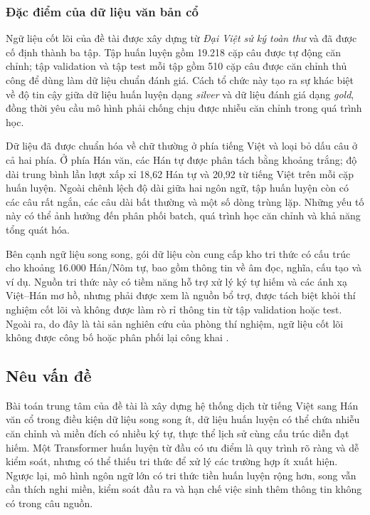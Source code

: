 \subsubsection{Đặc điểm của dữ liệu văn bản cổ}

Ngữ liệu cốt lõi của đề tài được xây dựng từ \textit{Đại Việt sử ký toàn thư} và đã được cố định thành ba tập. Tập huấn luyện gồm 19.218 cặp câu được tự động căn chỉnh; tập validation và tập test mỗi tập gồm 510 cặp câu được căn chỉnh thủ công để dùng làm dữ liệu chuẩn đánh giá. Cách tổ chức này tạo ra sự khác biệt về độ tin cậy giữa dữ liệu huấn luyện dạng \textit{silver} và dữ liệu đánh giá dạng \textit{gold}, đồng thời yêu cầu mô hình phải chống chịu được nhiễu căn chỉnh trong quá trình học.

Dữ liệu đã được chuẩn hóa về chữ thường ở phía tiếng Việt và loại bỏ dấu câu ở cả hai phía. Ở phía Hán văn, các Hán tự được phân tách bằng khoảng trắng; độ dài trung bình lần lượt xấp xỉ 18,62 Hán tự và 20,92 từ tiếng Việt trên mỗi cặp huấn luyện. Ngoài chênh lệch độ dài giữa hai ngôn ngữ, tập huấn luyện còn có các câu rất ngắn, các câu dài bất thường và một số dòng trùng lặp. Những yếu tố này có thể ảnh hưởng đến phân phối batch, quá trình học căn chỉnh và khả năng tổng quát hóa.

Bên cạnh ngữ liệu song song, gói dữ liệu còn cung cấp kho tri thức có cấu trúc cho khoảng 16.000 Hán/Nôm tự, bao gồm thông tin về âm đọc, nghĩa, cấu tạo và ví dụ. Nguồn tri thức này có tiềm năng hỗ trợ xử lý ký tự hiếm và các ánh xạ Việt--Hán mơ hồ, nhưng phải được xem là nguồn bổ trợ, được tách biệt khỏi thí nghiệm cốt lõi và không được làm rò rỉ thông tin từ tập validation hoặc test. Ngoài ra, do đây là tài sản nghiên cứu của phòng thí nghiệm, ngữ liệu cốt lõi không được công bố hoặc phân phối lại công khai \cite{projectspec2026}.

\subsection{Nêu vấn đề}

Bài toán trung tâm của đề tài là xây dựng hệ thống dịch từ tiếng Việt sang Hán văn cổ trong điều kiện dữ liệu song song ít, dữ liệu huấn luyện có thể chứa nhiễu căn chỉnh và miền đích có nhiều ký tự, thực thể lịch sử cùng cấu trúc diễn đạt hiếm. Một Transformer huấn luyện từ đầu có ưu điểm là quy trình rõ ràng và dễ kiểm soát, nhưng có thể thiếu tri thức để xử lý các trường hợp ít xuất hiện. Ngược lại, mô hình ngôn ngữ lớn có tri thức tiền huấn luyện rộng hơn, song vẫn cần thích nghi miền, kiểm soát đầu ra và hạn chế việc sinh thêm thông tin không có trong câu nguồn.

